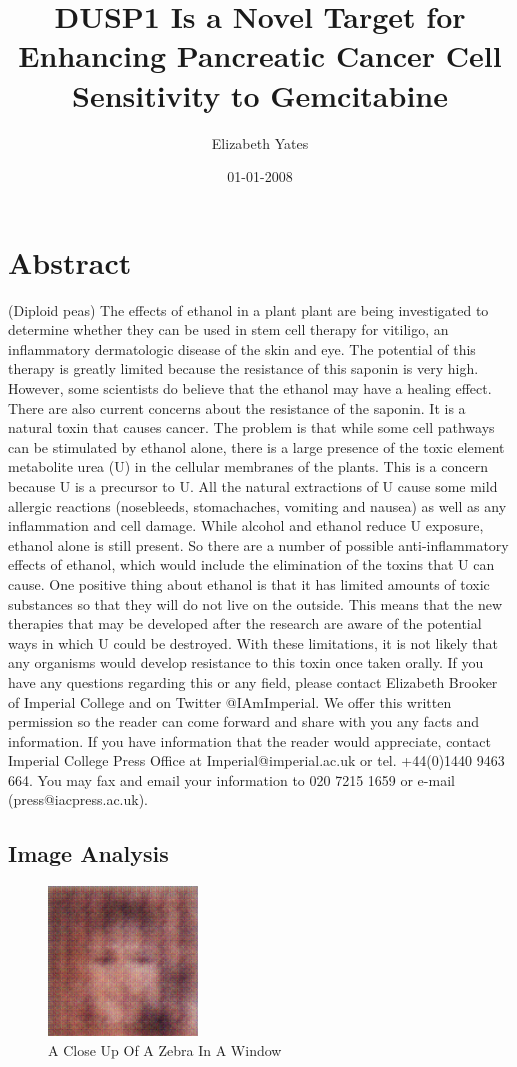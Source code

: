 \documentclass{article}%
\title{DUSP1 Is a Novel Target for Enhancing Pancreatic Cancer Cell Sensitivity to Gemcitabine}%
\author{Elizabeth Yates}%
\affil{Department of Genetics, Washington University School of Medicine, St. Louis, Missouri, United States of America}%
\date{01{-}01{-}2008}%
\begin{document}
%
\normalsize%
\maketitle%
\section{Abstract}%
\label{sec:Abstract}%
(Diploid peas)\newline%
The effects of ethanol in a plant plant are being investigated to determine whether they can be used in stem cell therapy for vitiligo, an inflammatory dermatologic disease of the skin and eye. The potential of this therapy is greatly limited because the resistance of this saponin is very high. However, some scientists do believe that the ethanol may have a healing effect. There are also current concerns about the resistance of the saponin. It is a natural toxin that causes cancer.\newline%
The problem is that while some cell pathways can be stimulated by ethanol alone, there is a large presence of the toxic element metabolite urea (U) in the cellular membranes of the plants. This is a concern because U is a precursor to U. All the natural extractions of U cause some mild allergic reactions (nosebleeds, stomachaches, vomiting and nausea) as well as any inflammation and cell damage. While alcohol and ethanol reduce U exposure, ethanol alone is still present.\newline%
So there are a number of possible anti{-}inflammatory effects of ethanol, which would include the elimination of the toxins that U can cause. One positive thing about ethanol is that it has limited amounts of toxic substances so that they will do not live on the outside. This means that the new therapies that may be developed after the research are aware of the potential ways in which U could be destroyed. With these limitations, it is not likely that any organisms would develop resistance to this toxin once taken orally.\newline%
If you have any questions regarding this or any field, please contact Elizabeth Brooker of Imperial College and on Twitter @IAmImperial.\newline%
We offer this written permission so the reader can come forward and share with you any facts and information. If you have information that the reader would appreciate, contact Imperial College Press Office at Imperial@imperial.ac.uk or tel. +44(0)1440 9463 664. You may fax and email your information to 020 7215 1659 or e{-}mail (press@iacpress.ac.uk).

%
\subsection{Image Analysis}%
\label{subsec:ImageAnalysis}%


\begin{figure}[h!]%
\centering%
\includegraphics[width=150px]{500_fake_images/samples_5_242.png}%
\caption{A Close Up Of A Zebra In A Window}%
\end{figure}

%
\end{document}
